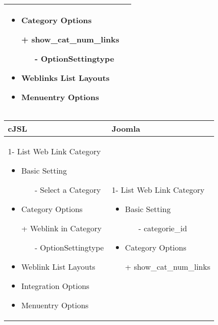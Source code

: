 \begin{minipage}{0.7\textwidth}
\begin{tabular}{|p{} | p{}|}
\begin{itemize}
\begin{enumerate}
	   \end{enumerate}
   	\item Category Options
   	\item[+] show\_cat\_num\_links
   		    	  \begin{enumerate}
   		    			 \item[-] OptionSettingtype
   		    	\end{enumerate}
   	\item Weblinks List Layouts
	\item Menuentry Options
 \end{itemize}
\\
\hline
\end{tabular}
\end{minipage}

\begin{minipage}{0.7\textwidth}
\begin{tabular}{|p{} | p{}|}
\hline
\textbf{cJSL} & \textbf{Joomla} \\ 
\hline
 1- List Web Link Category
   \begin{itemize}
     \item Basic  Setting 
    		\begin{enumerate}
    			\item[-] Select a Category 
    		\end{enumerate}
    	\item Category Options
    	\item[+] Weblink in Category 
    		    	  \begin{enumerate}
    		    			 \item[-] OptionSettingtype
    		    	\end{enumerate}
    \item Weblink List Layouts
    	\item Integration Options
 	\item Menuentry Options
  \end{itemize}
 & 
1- List Web Link Category
  \begin{itemize}
    \item Basic  Setting 
   		\begin{enumerate}
   			\item[-] categorie\_id
   		\end{enumerate}
   	\item Category Options
   	\item[+] show\_cat\_num\_links
   		    	  \begin{enumerate}

\end{enumerate}
\end{itemize}
\end{tabular}
\end{minipage}
